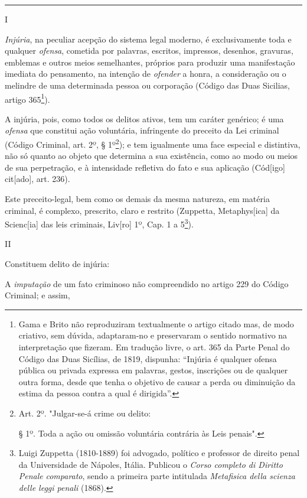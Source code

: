 \begin{center}\rule{0.5\linewidth}{\linethickness}\end{center}

I

\emph{Injúria}, na peculiar acepção do sistema legal moderno, é
exclusivamente toda e qualquer \emph{ofensa}, cometida por palavras,
escritos, impressos, desenhos, gravuras, emblemas e outros meios
semelhantes, próprios para produzir uma manifestação imediata do
pensamento, na intenção de \emph{ofender} a honra, a consideração ou o
melindre de uma determinada pessoa ou corporação (Código das Duas
Sicilias, artigo 365\footnote{Gama e Brito não reproduziram textualmente
  o artigo citado mas, de modo criativo, sem dúvida, adaptaram-no e
  preservaram o sentido normativo na interpretação que fizeram. Em
  tradução livre, o art. 365 da Parte Penal do Código das Duas Sicílias,
  de 1819, dispunha: ``Injúria é qualquer ofensa pública ou privada
  expressa em palavras, gestos, inscrições ou de qualquer outra forma,
  desde que tenha o objetivo de causar a perda ou diminuição da estima
  da pessoa contra a qual é dirigida''.}).

A injúria, pois, como todos os delitos ativos, tem um caráter genérico;
é uma \emph{ofensa} que constitui ação voluntária, infringente do
preceito da Lei criminal (Código Criminal, art. 2º, § 1º\footnote{Art.
  2º. "Julgar-se-á crime ou delito:

  § 1º. Toda a ação ou omissão voluntária contrária às Leis penais".});
e tem igualmente uma face especial e distintiva, não só quanto ao objeto
que determina a sua existência, como ao modo ou meios de sua
perpetração, e à intensidade refletiva do fato e sua aplicação
(Cód{[}igo{]} cit{[}ado{]}, art. 236).

Este preceito-legal, bem como os demais da mesma natureza, em matéria
criminal, é complexo, prescrito, claro e restrito (Zuppetta,
Metaphys{[}ica{]} da Scienc{[}ia{]} das leis criminais, Liv{[}ro{]} 1º,
Cap. 1 a 5\footnote{Luigi Zuppetta (1810-1889) foi advogado, político e
  professor de direito penal da Universidade de Nápoles, Itália.
  Publicou o \emph{Corso completo di Diritto Penale} \emph{comparato},
  sendo a primeira parte intitulada \emph{Metafisica della scienza delle
  leggi penali} (1868).}).

II

Constituem delito de injúria:

A \emph{imputação} de um fato criminoso não compreendido no artigo 229
do Código Criminal; e assim,

